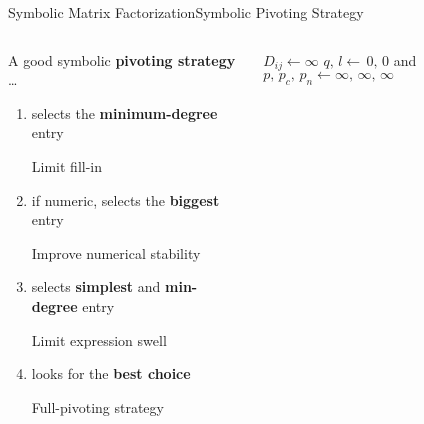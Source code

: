 \begin{frame}{Symbolic Matrix Factorization}{Symbolic Pivoting Strategy}
  \vspace{-1.5em}
  \begin{columns}
    \begin{column}[c]{0.47\textwidth}
      A good symbolic \textbf{pivoting strategy} \dots
      \begin{enumerate}
        \item<1> selects the \textbf{minimum-degree} entry \\
        \begin{small}
          \qquad Limit fill-in
        \end{small}
        \item<2> if numeric, selects the \textbf{biggest} entry \\
        \begin{small}
          \qquad Improve numerical stability
        \end{small}
        \item<3> selects \textbf{simplest} and \textbf{min-degree} entry \\
        \begin{small}
          \qquad Limit expression swell
        \end{small}
        \item<4> looks for the \textbf{best choice} \\
        \begin{small}
          \qquad Full-pivoting strategy
        \end{small}
      \end{enumerate}
    \end{column}
    \begin{column}[c]{0.53\textwidth}
      \begin{algorithmic}\scriptsize
        \State {}
              \State $D_{ij} \gets \infty$
              {}
            \EndFor
          \EndFor
          \State {}
          \State $q, \, l \gets \, 0, \, 0$  and $p, \, p_c, \, p_n \gets \infty, \, \infty, \, \infty$

\end{algorithmic}
\end{column}
\end{columns}
\end{frame}
